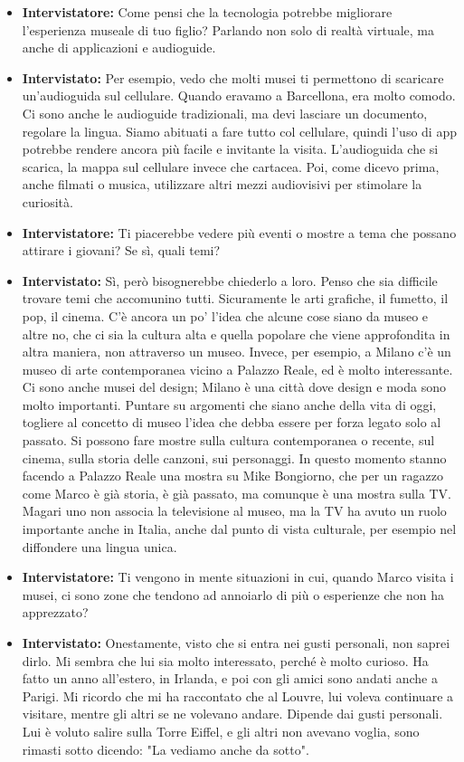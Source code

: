 \documentclass{article}
\begin{document}
\begin{itemize}
    \item \textbf{Intervistatore:} Come pensi che la tecnologia potrebbe migliorare l'esperienza museale di tuo figlio? Parlando non solo di realtà virtuale, ma anche di applicazioni e audioguide.
    \item \textbf{Intervistato:} Per esempio, vedo che molti musei ti permettono di scaricare un'audioguida sul cellulare. Quando eravamo a Barcellona, era molto comodo. Ci sono anche le audioguide tradizionali, ma devi lasciare un documento, regolare la lingua. Siamo abituati a fare tutto col cellulare, quindi l'uso di app potrebbe rendere ancora più facile e invitante la visita. L'audioguida che si scarica, la mappa sul cellulare invece che cartacea. Poi, come dicevo prima, anche filmati o musica, utilizzare altri mezzi audiovisivi per stimolare la curiosità.
    \item \textbf{Intervistatore:} Ti piacerebbe vedere più eventi o mostre a tema che possano attirare i giovani? Se sì, quali temi?
    \item \textbf{Intervistato:} Sì, però bisognerebbe chiederlo a loro. Penso che sia difficile trovare temi che accomunino tutti. Sicuramente le arti grafiche, il fumetto, il pop, il cinema. C'è ancora un po' l'idea che alcune cose siano da museo e altre no, che ci sia la cultura alta e quella popolare che viene approfondita in altra maniera, non attraverso un museo. Invece, per esempio, a Milano c'è un museo di arte contemporanea vicino a Palazzo Reale, ed è molto interessante. Ci sono anche musei del design; Milano è una città dove design e moda sono molto importanti. Puntare su argomenti che siano anche della vita di oggi, togliere al concetto di museo l'idea che debba essere per forza legato solo al passato. Si possono fare mostre sulla cultura contemporanea o recente, sul cinema, sulla storia delle canzoni, sui personaggi. In questo momento stanno facendo a Palazzo Reale una mostra su Mike Bongiorno, che per un ragazzo come Marco è già storia, è già passato, ma comunque è una mostra sulla TV. Magari uno non associa la televisione al museo, ma la TV ha avuto un ruolo importante anche in Italia, anche dal punto di vista culturale, per esempio nel diffondere una lingua unica.
    \item \textbf{Intervistatore:} Ti vengono in mente situazioni in cui, quando Marco visita i musei, ci sono zone che tendono ad annoiarlo di più o esperienze che non ha apprezzato?
    \item \textbf{Intervistato:} Onestamente, visto che si entra nei gusti personali, non saprei dirlo. Mi sembra che lui sia molto interessato, perché è molto curioso. Ha fatto un anno all'estero, in Irlanda, e poi con gli amici sono andati anche a Parigi. Mi ricordo che mi ha raccontato che al Louvre, lui voleva continuare a visitare, mentre gli altri se ne volevano andare. Dipende dai gusti personali. Lui è voluto salire sulla Torre Eiffel, e gli altri non avevano voglia, sono rimasti sotto dicendo: "La vediamo anche da sotto".

\end{itemize}
\end{document}
